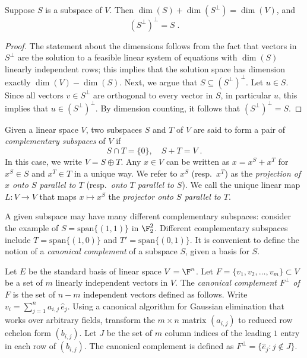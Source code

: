 \begin{lemma}
  \label{lem:perp_perp}
  Suppose $S$ is a subspace of $V$. Then $\dim(S) + \dim(S^\perp) =
  \dim(V)$, and 
  \begin{equation*}
    (S^\perp)^\perp = S\;.
  \end{equation*}
\end{lemma}

\begin{proof}
  The statement about the dimensions follows from the fact that vectors in $S^\perp$ are
  the solution to a feasible linear system of equations with $\dim(S)$ linearly
  independent rows; this implies that the solution space has dimension exactly
  $\dim(V) - \dim(S)$.
  Next, we argue that $S \subseteq (S^\perp)^\perp$.
  Let $u \in S$.
  Since all vectors $v \in S^\perp$ are orthogonal to every vector in $S$,
  in particular $u$, this implies that $u \in (S^\perp)^\perp$.
  By dimension counting, it follows that $(S^\perp)^\perp = S$.
\end{proof}

\begin{definition}\label{def:complementary}
  Given a linear space $V$, two subspaces $S$ and $T$ of $V$ are said to form a
  pair of \emph{complementary subspaces} of $V$ if
\begin{equation*}
  S \cap T = \{ 0 \}, \quad S + T = V\;.
\end{equation*}
In this case, we write $V = S \oplus T$.
Any $x\in V$ can be written as $x = x^S + x^T$ for $x^S \in S$ and $x^T \in T$
in a unique way.
We refer to $x^S$ (resp.~$x^T$) as the \emph{projection of $x$ onto $S$ parallel
  to $T$} (resp.~\emph{onto $T$ parallel to $S$}).
We call the unique linear map $L: V \to V$ that maps $x \mapsto x^S$ the
\emph{projector onto $S$ parallel to $T$}.
\end{definition}

A given subspace may have many different complementary subspaces: consider the
example of $S = \mathrm{span}\{(1,1) \}$ in $\F_2^2$.
Different complementary subspaces include $T = \mathrm{span}\{(1,0)\}$ and
$T' = \mathrm{span}\{(0,1)\}$.
It is convenient to define the notion of a \emph{canonical complement} of a
subspace $S$, given a basis for $S$.

\begin{definition}
  \label{def:canonical-complement}
  Let $E$ be the standard basis of linear space $V = \F^n$.
  Let $F = \{v_1, v_2, \ldots, v_m\} \subset V$ be a set of $m$ linearly
  independent vectors in $V$.
  The \emph{canonical complement $F^\perp$ of $F$} is the set of $n-m$ independent
  vectors defined as follows.
  Write $v_i = \sum_{j=1}^n a_{i, j}\, \hat{e}_j$.
	Using a canonical algorithm for Gaussian elimination that works over arbitrary
  fields, transform the $m\times n$ matrix $(a_{i, j})$ to reduced row echelon
  form $(b_{i, j})$.
  Let $J$ be the set of $m$ column indices of the leading $1$ entry in each row
  of $(b_{i, j})$.
  The canonical complement is defined as $F^\perp = \{ \hat{e}_j : j \not\in J \}$.
\end{definition}


